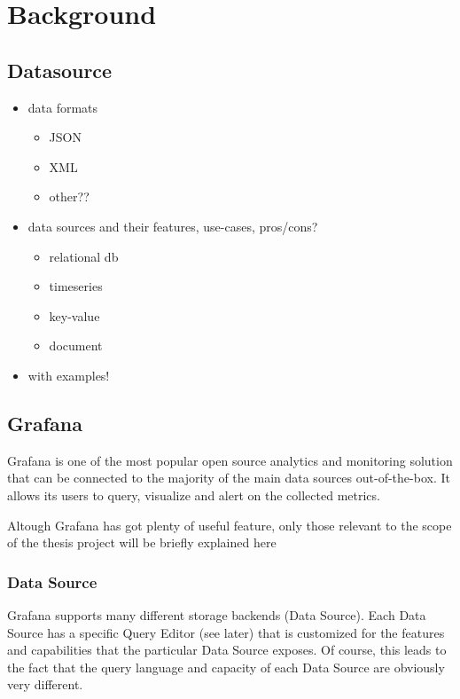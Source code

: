 \chapter{Background}

\section{Datasource}

\begin{itemize}
	\item data formats
	\begin{itemize}
		\item JSON
		\item XML
		\item other??
	\end{itemize}
	\item data sources and their features, use-cases, pros/cons?
	\begin{itemize}
		\item relational db
		\item timeseries
		\item key-value
		\item document
	\end{itemize}
	\item with examples!
\end{itemize}


\section{Grafana}

Grafana is one of the most popular open source analytics and monitoring solution that can be connected to the majority of the main data sources out-of-the-box. It allows its users to query, visualize and alert on the collected metrics. 

Altough Grafana has got plenty of useful feature, only those relevant to the scope of the thesis project will be briefly explained here


\subsection{Data Source}

Grafana supports many different storage backends (Data Source). Each Data Source has a specific Query Editor (see later) that is customized for the features and capabilities that the particular Data Source exposes. Of course, this leads to the fact that the query language and capacity of each Data Source are obviously very different.

